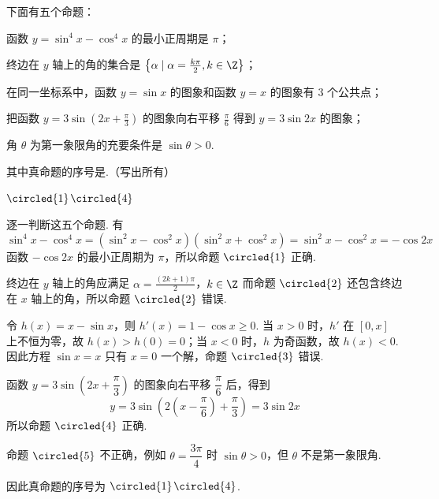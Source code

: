\begin{problem}
下面有五个命题：

\begin{circlelist}
\item 函数 \( y = \sin^4 x - \cos^4 x \) 的最小正周期是 \( \pi \)；
\item 终边在 \( y \) 轴上的角的集合是 \( \left\{ \alpha \mid \alpha = \frac{k\pi}{2}, k \in \Z \right\} \)；
\item 在同一坐标系中，函数 \( y = \sin x \) 的图象和函数 \( y = x \) 的图象有 \(3\) 个公共点；
\item 把函数 \( y = 3\sin \left(2x + \frac{\pi}{3}\right) \) 的图象向右平移 \( \frac{\pi}{6} \) 得到 \( y = 3\sin 2x \) 的图象；
\item 角 \(\theta\) 为第一象限角的充要条件是 \(\sin \theta > 0\).
\end{circlelist}

其中真命题的序号是\fillinblank{}.（写出所有）
\end{problem}

\begin{answer}
\(\circled{1}\)\(\circled{4}\)
\end{answer}

\begin{solution}
逐一判断这五个命题. 有
\[
\sin^{4}x-\cos^{4}x=(\sin^{2}x-\cos^{2}x)(\sin^{2}x+\cos^{2}x)
 =\sin^{2}x-\cos^{2}x=-\cos2x
\]
函数 \(-\cos2x\) 的最小正周期为 \(\pi\)，所以命题 \(\circled{1}\) 正确.

终边在 \(y\) 轴上的角应满足
\(\alpha=\frac{(2k+1)\pi}{2}\)，\(k\in\Z\)
而命题 \(\circled{2}\) 还包含终边在 \(x\) 轴上的角，所以命题 \(\circled{2}\) 错误.

令 \(h(x)=x-\sin x\)，则 \(h'(x)=1-\cos x\geqslant0\). 当 \(x>0\) 时，\(h'\) 在 \([0,x]\) 上不恒为零，故 \(h(x)>h(0)=0\)；当 \(x<0\) 时，\(h\) 为奇函数，故 \(h(x)<0\). 因此方程 \(\sin x=x\) 只有 \(x=0\) 一个解，命题 \(\circled{3}\) 错误.

函数 \(y=3\sin\left(2x+\dfrac\pi3\right)\) 的图象向右平移 \(\dfrac\pi6\) 后，得到
\[
y=3\sin\left(2\left(x-\frac\pi6\right)+\frac\pi3\right)=3\sin2x
\]
所以命题 \(\circled{4}\) 正确.

命题 \(\circled{5}\) 不正确，例如 \(\theta=\dfrac{3\pi}{4}\) 时 \(\sin\theta>0\)，但 \(\theta\) 不是第一象限角.

因此真命题的序号为 \(\circled{1}\)\(\circled{4}\).
\end{solution}

